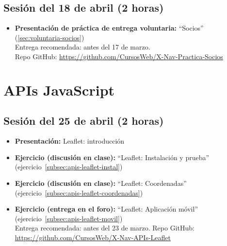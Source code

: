 \documentclass[a4paper,12pt]{report}
\begin{document}
\subsection{Sesión del 18 de abril (2 horas)}

\begin{itemize}
\item \textbf{Presentación de práctica de entrega voluntaria:} ``Socios'' (\ref{sec:voluntaria-socios}) \\
  Entrega recomendada: antes del 17 de marzo. \\
  Repo GitHub: \url{https://github.com/CursosWeb/X-Nav-Practica-Socios}
\end{itemize}


\section{APIs JavaScript}

\subsection{Sesión del 25 de abril (2 horas)}

\begin{itemize}
\item \textbf{Presentación:} Leaflet: introducción
\item \textbf{Ejercicio (discusión en clase):} ``Leaflet: Instalación y prueba'' (ejercicio~\ref{subsec:apis-leaflet-instal})
\item \textbf{Ejercicio (discusión en clase):} ``Leaflet: Coordenadas'' (ejercicio~\ref{subsec:apis-leaflet-coordenadas})
\item \textbf{Ejercicio (entrega en el foro):} ``Leaflet: Aplicación móvil'' (ejercicio~\ref{subsec:apis-leaflet-movil}) \\
  Entrega recomendada: antes del 23 de marzo.
  Repo GitHub: \url{https://github.com/CursosWeb/X-Nav-APIs-Leaflet}
\end{itemize}
\end{document}
